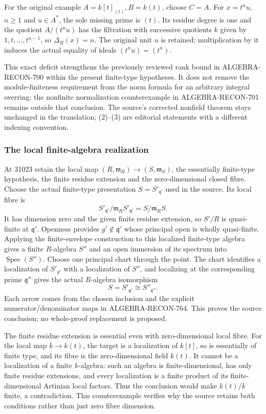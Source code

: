For the original example \(A=k[t]_{(t)}, B=k(t)\), choose \(C=A\). For \(x=t^n u\), \(n\geq1\) and \(u\in A^*\), the sole missing prime is \((t)\). Its residue degree is one and the quotient \(A/(t^n u)\) has the filtration with successive quotients \(k\) given by \(1,t,\ldots,t^{n-1}\), so \(\Delta_B(x)=n\). The original unit \(u\) is retained; multiplication by it induces the actual equality of ideals \((t^n u)=(t^n)\).

This exact deficit strengthens the previously reviewed rank bound in ALGEBRA-RECON-700 within the present finite-type hypotheses. It does not remove the module-finiteness requirement from the norm formula for an arbitrary integral overring: the nonfinite normalization counterexample in ALGEBRA-RECON-701 remains outside that conclusion. The source's corrected nonfield theorem stays unchanged in the translation; (2)--(3) are editorial statements with a different indexing convention.

\subsubsection{The local finite-algebra realization}\label{algebra-proof-033-the-local-finite-algebra-realization}

At 31023 retain the local map \((R,\mathfrak m_R)\to(S,\mathfrak m_S)\), the essentially finite-type hypothesis, the finite residue extension and the zero-dimensional closed fibre. Choose the actual finite-type presentation \(S=S'_{\mathfrak q'}\) used in the source. Its local fibre is \[
 S'_{\mathfrak q'}/\mathfrak m_R S'_{\mathfrak q'}
 =S/\mathfrak m_R S.
\] It has dimension zero and the given finite residue extension, so \(S'/R\) is quasi-finite at \(\mathfrak q'\). Openness provides \(g'\notin\mathfrak q'\) whose principal open is wholly quasi-finite. Applying the finite-envelope construction to this localized finite-type algebra gives a finite \(R\)-algebra \(S''\) and an open immersion of its spectrum into \(\operatorname{Spec}(S'')\). Choose one principal chart through the point. The chart identifies a localization of \(S'_{g'}\) with a localization of \(S''\), and localizing at the corresponding prime \(\mathfrak q''\) gives the actual \(R\)-algebra isomorphism \[
 S=S'_{\mathfrak q'}\cong S''_{\mathfrak q''}.
\] Each arrow comes from the chosen inclusion and the explicit numerator/denominator maps in ALGEBRA-RECON-764. This proves the source conclusion; no whole-proof replacement is proposed.

The finite residue extension is essential even with zero-dimensional local fibre. For the local map \(k\to k(t)\), the target is a localization of \(k[t]\), so is essentially of finite type, and its fibre is the zero-dimensional field \(k(t)\). It cannot be a localization of a finite \(k\)-algebra: such an algebra is finite-dimensional, has only finite residue extensions, and every localization is a finite product of its finite-dimensional Artinian local factors. Thus the conclusion would make \(k(t)/k\) finite, a contradiction. This counterexample verifies why the source retains both conditions rather than just zero fibre dimension.

